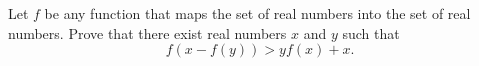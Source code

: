 Let $f$ be any function that maps the set of real numbers into the set of real numbers. Prove that there exist real numbers $x$ and $y$ such that
\[ f(x - f(y)) > yf(x) + x. \]
